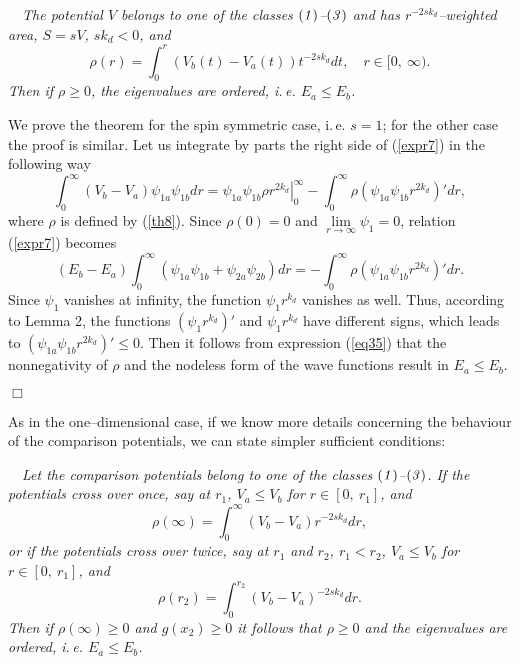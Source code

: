 \documentclass[amsmath,amssymb,superscriptaddress,showkeys, showpacs, aps, nofootinbib]{revtex4}
\begin{document}
 ~~{\it The potential $V$ belongs to one of the classes ${\it (1)}$--${\it (3)}$ and has $r^{-2sk_d}$--weighted area, $S=sV$, $sk_d<0$, and
\begin{equation}\label{th8}
\rho(r)=\int_0^r(V_b(t)-V_a(t))t^{-2sk_d}dt, \quad r\in [0,\ \infty).
\end{equation}
Then if $\rho\ge 0$, the eigenvalues are ordered, i.\,e. $E_a\le E_b$.}

\medskip

 We prove the theorem for the spin symmetric case, i.\,e. $s=1$; for the other case the proof is similar. Let us integrate by parts the right side of (\ref{expr7}) in the following way 
\begin{equation*}
\int_0^\infty(V_b-V_a)\psi_{1a}\psi_{1b}dr=
\left.\psi_{1a}\psi_{1b}\rho r^{2k_d}\right|_0^\infty-
\int_0^\infty\rho\left(\psi_{1a}\psi_{1b}r^{2k_d}\right)'dr,
\end{equation*}
where $\rho$ is defined by (\ref{th8}). Since $\rho(0)=0$ and $\lim\limits_{r\to\infty}\psi_{1}=0$, relation (\ref{expr7}) becomes
\begin{equation}\label{eq35}
(E_b - E_a)\int_0^\infty (\psi_{1a}\psi_{1b} + \psi_{2a}\psi_{2b})dr=
-\int_0^\infty\rho\left(\psi_{1a}\psi_{1b}r^{2k_d}\right)'dr.
\end{equation}
Since $\psi_1$ vanishes at infinity, the function $\psi_1 r^{k_d}$ vanishes as well. Thus, according to Lemma 2, the functions $\left(\psi_1 r^{k_d}\right)'$ and $\psi_1 r^{k_d}$ have different signs, which leads to $\left(\psi_{1a}\psi_{1b}r^{2k_d}\right)'\le 0$. Then it follows from expression (\ref{eq35}) that the nonnegativity of $\rho$ and the nodeless form of the wave functions result in $E_a\le E_b$.

\hfill $\Box$

As in the one--dimensional case, if we know more details concerning the behaviour of the comparison potentials, we can state simpler sufficient conditions:

\medskip

 ~~{\it Let the comparison potentials belong to one of the classes ${\it (1)}$--${\it (3)}$. If the potentials cross over once, say at $r_1$, $V_a\le V_b$ for $r\in [0,\ r_1]$, and
\begin{equation*}
\rho(\infty)=\int_0^\infty (V_b-V_a)r^{-2sk_d}dr,  
\end{equation*}
or if the potentials cross over twice, say at $r_1$ and $r_2$, $r_1<r_2$, $V_a\le V_b$ for $r\in [0,\ r_1]$, and
\begin{equation*}
\rho(r_2)=\int_0^{r_2} (V_b-V_a)^{-2sk_d} dr. 
\end{equation*}
Then if $\rho(\infty)\ge 0$ and $g(x_2)\ge 0$ it follows that $\rho\ge 0$ and the eigenvalues are ordered, i.\,e. $E_a\le E_b$.} 
\end{document}
